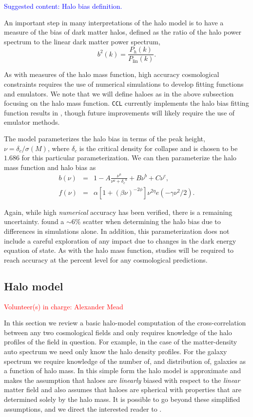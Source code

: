 \documentclass[\docopts]{\docclass}
\newcommand{\vol}[1]{\textcolor{red}{Volunteer(s) in charge: #1}}
\newcommand{\cont}[1]{\textcolor{blue}{Suggested content: #1}}
\begin{document}
\cont{Halo bias definition.}

An important step in many interpretations of the halo model is to have a measure of the bias of dark matter halos, defined as the ratio of the halo power spectrum to the linear dark matter power spectrum,
\begin{equation}
  b^2(k) = \frac{P_h(k)}{P_{\mathrm{lin}}(k)}.
  \label{eq:halo_bias}
\end{equation}

As with measures of the halo mass function, high accuracy cosmological constraints requires the use of numerical simulations to develop fitting functions and emulators. We note that we will define haloes as in the above subsection focusing on the halo mass function. {\tt CCL} currently implements the halo bias fitting function results in \citet{Tinker2010}, though future improvements will likely require the use of emulator methods.

The \citet{Tinker2010} model parameterizes the halo bias in terms of the peak height, $\nu = \delta_c / \sigma(M)$, where $\delta_c$ is the critical density for collapse and is chosen to be $1.686$ for this particular parameterization. We can then parameterize the halo mass function and halo bias as
\begin{eqnarray}
  b(\nu) &=& 1 - A\frac{\nu^a}{\nu^a + {\delta_c}^a} + B\nu^b+C\nu^c,\\
  f(\nu) &=& \alpha[1+(\beta\nu)^{-2\phi}]\nu^{2\eta}e(-\gamma\nu^2/2).
\end{eqnarray}

Again, while high {\em numerical} accuracy has been verified, there is a remaining uncertainty. \citet{Tinker2010} found a $\sim6\%$ scatter when determining the halo bias due to differences in simulations alone. In addition, this parameterization does not include a careful exploration of any impact due to changes in the dark energy equation of state. As with the halo mass function, studies will be required to reach accuracy at the percent level for any cosmological predictions. 

\subsection{Halo model}
\label{sec:halo_model}
\vol{Alexander Mead}

In this section we review a basic halo-model computation \citep{Seljak2000,Peacock2000,Cooray2002} of the cross-correlation between any two cosmological fields and only requires knowledge of the halo profiles of the field in question. For example, in the case of the matter-density auto spectrum we need only know the halo density profiles. For the galaxy spectrum we require knowledge of the number of, and distribution of, galaxies as a function of halo mass. In this simple form the halo model is approximate and makes the assumption that haloes are \emph{linearly} biased with respect to the \emph{linear} matter field and also assumes that haloes are spherical with properties that are determined solely by the halo mass. It is possible to go beyond these simplified assumptions, and we direct the interested reader to \cite{Cooray2002,Smith2007,Giocoli2010,Smith2011}.
\end{document}
